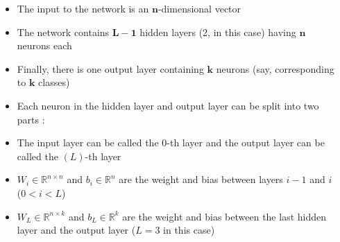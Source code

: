 \savestack{\nn}{}

\begin{frame}
\end{frame}

\begin{frame}
  \begin{columns}
    \begin{overlayarea}{\textwidth}{\textheight}
      
    \end{overlayarea}

    \begin{overlayarea}{\textwidth}{\textheight}
      \begin{itemize}
        \justifying
        \item<1-> The input to the network is an $\mathbf{n}$-dimensional vector
        \item<3-> The network contains $\mathbf{L-1}$ hidden layers (2, in this case) having $\mathbf{n}$ neurons each
        \item<5-> Finally, there is one output layer containing $\mathbf{k}$ neurons (say, corresponding to $\mathbf{k}$ classes)
        \item<7-> Each neuron in the hidden layer and output layer can be split into two parts :   
        \item<12-> The input layer can be called the $0$-th layer and the output layer can be called the $(L)$-th layer
        \item<13-> $W_i \in \mathbb{R}^{n\times n}$ and $b_i \in \mathbb{R}^n$ are the weight and bias between layers $i-1$ and $i$  ($0<i<L$)
        \item<15-> $W_{L} \in \mathbb{R}^{n\times k}$ and $b_{L} \in \mathbb{R}^k$ are the weight and bias between the last hidden layer and the output layer ($L = 3$ in this case)
      \end{itemize}
    \end{overlayarea}
  \end{columns}
\end{frame}

